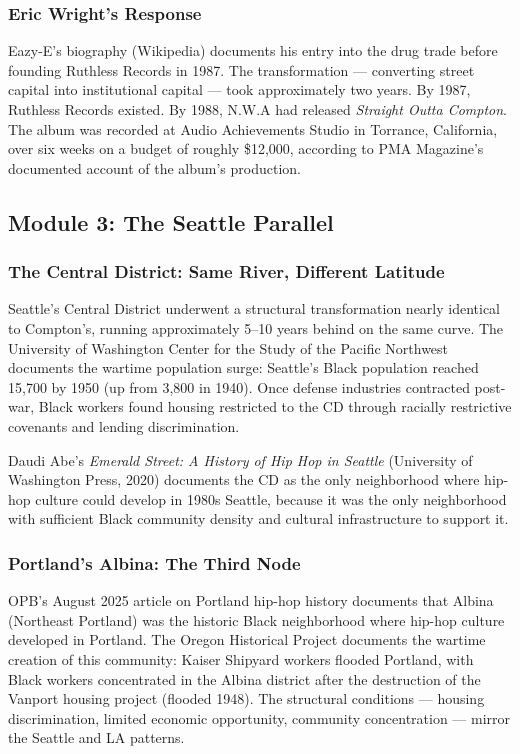 \documentclass[11pt,letterpaper]{article}
\begin{document}
\subsubsection{Eric Wright's Response}

Eazy-E's biography (Wikipedia) documents his entry into the drug trade before founding Ruthless Records in 1987. The transformation --- converting street capital into institutional capital --- took approximately two years. By 1987, Ruthless Records existed. By 1988, N.W.A had released \textit{Straight Outta Compton}. The album was recorded at Audio Achievements Studio in Torrance, California, over six weeks on a budget of roughly \$12,000, according to PMA Magazine's documented account of the album's production.

\subsection{Module 3: The Seattle Parallel}

\subsubsection{The Central District: Same River, Different Latitude}

Seattle's Central District underwent a structural transformation nearly identical to Compton's, running approximately 5--10 years behind on the same curve. The University of Washington Center for the Study of the Pacific Northwest documents the wartime population surge: Seattle's Black population reached 15,700 by 1950 (up from 3,800 in 1940). Once defense industries contracted post-war, Black workers found housing restricted to the CD through racially restrictive covenants and lending discrimination.

Daudi Abe's \textit{Emerald Street: A History of Hip Hop in Seattle} (University of Washington Press, 2020) documents the CD as the only neighborhood where hip-hop culture could develop in 1980s Seattle, because it was the only neighborhood with sufficient Black community density and cultural infrastructure to support it.

\subsubsection{Portland's Albina: The Third Node}

OPB's August 2025 article on Portland hip-hop history documents that Albina (Northeast Portland) was the historic Black neighborhood where hip-hop culture developed in Portland. The Oregon Historical Project documents the wartime creation of this community: Kaiser Shipyard workers flooded Portland, with Black workers concentrated in the Albina district after the destruction of the Vanport housing project (flooded 1948). The structural conditions --- housing discrimination, limited economic opportunity, community concentration --- mirror the Seattle and LA patterns.
\end{document}
